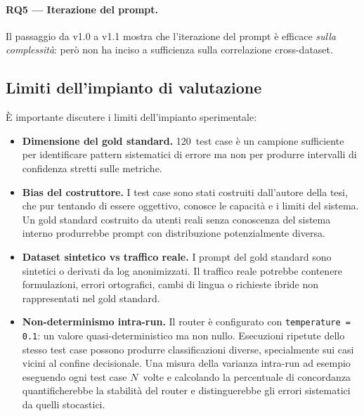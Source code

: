 \paragraph{RQ5 --- Iterazione del prompt.} Il passaggio da v1.0 a v1.1 mostra che l'iterazione del prompt è efficace \emph{sulla complessità}: 
però non ha inciso a sufficienza sulla correlazione cross-dataset.

\subsection{Limiti dell'impianto di valutazione}
\label{subsec:eval-limiti}

È importante discutere i limiti dell'impianto sperimentale:

\begin{itemize}
  \item \textbf{Dimensione del gold standard.} 120~test case è un campione sufficiente per identificare 
  pattern sistematici di errore ma non per produrre intervalli di confidenza stretti sulle metriche.  

  \item \textbf{Bias del costruttore.} I test case sono stati costruiti dall'autore della tesi, 
  che pur tentando di essere oggettivo, conosce le capacità e i limiti del sistema. 
  Un gold standard costruito da utenti reali senza conoscenza del sistema interno produrrebbe prompt con distribuzione potenzialmente diversa.

  \item \textbf{Dataset sintetico vs traffico reale.} I prompt del gold standard sono sintetici o derivati da log anonimizzati. 
  Il traffico reale potrebbe contenere formulazioni, errori ortografici, cambi di lingua o richieste ibride non rappresentati nel gold standard.

  \item \textbf{Non-determinismo intra-run.} Il router è configurato con \texttt{temperature = 0.1}: un valore quasi-deterministico ma non nullo. 
  Esecuzioni ripetute dello stesso test case possono produrre classificazioni diverse, specialmente sui casi vicini al confine decisionale. 
  Una misura della varianza intra-run ad esempio eseguendo ogni test case $N$~volte e calcolando la percentuale di concordanza quantificherebbe la stabilità del router e 
  distinguerebbe gli errori sistematici da quelli stocastici.

 \end{itemize}

